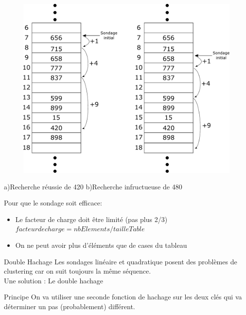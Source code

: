 \documentclass[12pt,a4paper]{beamer}
\newcommand{\hl}[1]{\textcolor{blueemph}{#1}}
\begin{document}
\begin{frame}
\begin{figure}
\includegraphics[scale=0.28]{figs/ht_quad}
\end{figure}
\hspace{-1em}a)Recherche réussie de 420  \hspace{1em}  b)Recherche infructueuse de 480
\end{frame}


\begin{frame}
Pour que le sondage soit efficace:
\begin{itemize}
\item Le \hl{facteur de charge} doit être limité (pas plus 2/3)\\
$facteur de charge = nbElements/tailleTable$
\item On ne peut avoir plus d’éléments que de cases du tableau
\end{itemize}
\end{frame}



\begin{frame}{Double Hachage}
Les sondages linéaire et quadratique posent des problèmes de clustering car on suit toujours la même séquence.\pause \\
\vspace{1em}
Une solution : \hl{Le double hachage}

\begin{block}{Principe}
On va utiliser une seconde fonction de hachage sur les deux clés qui va déterminer un pas (probablement) différent.
\end{block}

\end{frame}
\end{document}
